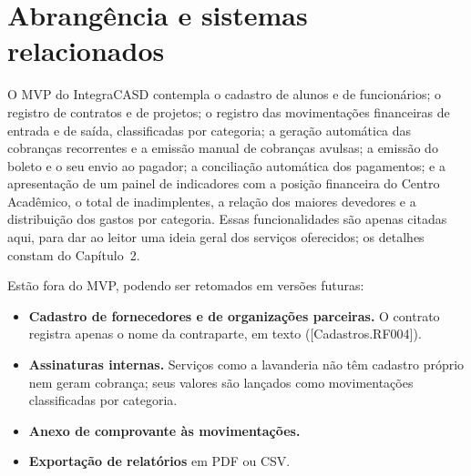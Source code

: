 \documentclass[11pt,a4paper,oneside]{report}
\begin{document}
\section{Abrangência e sistemas relacionados}

O MVP do IntegraCASD contempla o cadastro de alunos e de funcionários; o registro de contratos e de
projetos; o registro das movimentações financeiras de entrada e de saída, classificadas por
categoria; a geração automática das cobranças recorrentes e a emissão manual de cobranças avulsas;
a emissão do boleto e o seu envio ao pagador; a conciliação automática dos pagamentos; e a
apresentação de um painel de indicadores com a posição financeira do Centro Acadêmico, o total de
inadimplentes, a relação dos maiores devedores e a distribuição dos gastos por categoria. Essas
funcionalidades são apenas citadas aqui, para dar ao leitor uma ideia geral dos serviços oferecidos;
os detalhes constam do Capítulo~2.

Estão fora do MVP, podendo ser retomados em versões futuras:
\begin{itemize}
  \item \textbf{Cadastro de fornecedores e de organizações parceiras.} O contrato registra apenas o
        nome da contraparte, em texto ([Cadastros.RF004]).
  \item \textbf{Assinaturas internas.} Serviços como a lavanderia não têm cadastro próprio nem
        geram cobrança; seus valores são lançados como movimentações classificadas por categoria.
  \item \textbf{Anexo de comprovante às movimentações.}
  \item \textbf{Exportação de relatórios} em PDF ou CSV.
\end{itemize}
\end{document}
